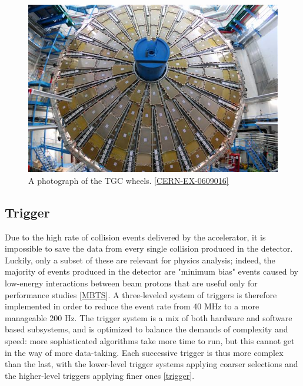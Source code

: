 \begin{figure}
  \includegraphics[width=\linewidth]{figures/detector_chapter/TGCWheel.png}
  \caption{A photograph of the TGC wheels. \ref{CERN-EX-0609016}}
  \label{fig:TGCWheel}
\end{figure}

\subsection{Trigger} \label{sec:Trigger}
Due to the high rate of collision events delivered by the accelerator, it is impossible to save the data from every single collision produced in the detector. Luckily, only a subset of these are relevant for physics analysis; indeed, the majority of events produced in the detector are "minimum bias" events caused by low-energy interactions between beam protons that are useful only for performance studies \ref{MBTS}. A three-leveled system of triggers is therefore implemented in order to reduce the event rate from 40 MHz to a more manageable 200 Hz. The trigger system is a mix of both hardware and software based subsystems, and is optimized to balance the demands of complexity and speed: more sophisticated algorithms take more time to run, but this cannot get in the way of more data-taking. Each successive trigger is thus more complex than the last, with the lower-level trigger systems applying coarser selections and the higher-level triggers applying finer ones \ref{trigger}.

